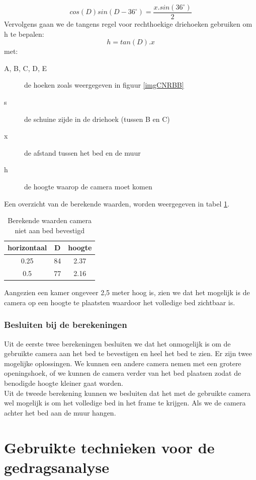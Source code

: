 \begin{displaymath}
cos(D)sin(D-36 ^\circ)=\frac{x . sin(36^\circ)}{2}
\end{displaymath}
Vervolgens gaan we de tangens regel voor rechthoekige driehoeken gebruiken om h te bepalen:
\begin{displaymath}
h=tan(D) . x
\end{displaymath}
met:
\begin{description}
	\item [A, B, C, D, E] de hoeken zoals weergegeven in figuur \ref{imgCNRBB}
	\item[s] de schuine zijde in de driehoek (tussen B en C)
	\item[x] de afstand tussen het bed en de muur
	\item[h] de hoogte waarop de camera moet komen
\end{description}
Een overzicht van de berekende waarden, worden weergegeven in tabel \ref{refTabCNB}.

\begin{table}[hbp]
	\caption{Berekende waarden camera niet aan bed bevestigd}
	\begin{tabular}{|c|c|c|}
		\hline
		horizontaal & D & hoogte \\ \hline
		0.25 & 84 & 2.37 \\ \hline
		0.5 & 77 & 2.16 \\ 
		\hline
	\end{tabular}
	\label{refTabCNB}
\end{table}
Aangezien een kamer ongeveer 2,5 meter hoog is, zien we dat het mogelijk is de camera op een hoogte te plaatsten waardoor het volledige bed zichtbaar is.

\subsubsection{Besluiten bij de berekeningen}
Uit de eerste twee berekeningen besluiten we dat het onmogelijk is om de gebruikte camera aan het bed te bevestigen en heel het bed te zien. Er zijn twee mogelijke oplossingen. We kunnen een andere camera nemen met een grotere openingshoek, of we kunnen de camera verder van het bed plaatsen zodat de benodigde hoogte kleiner gaat worden.\\
Uit de tweede berekening kunnen we besluiten dat het met de gebruikte camera wel mogelijk is om het volledige bed in het frame te krijgen. Als we de camera achter het bed aan de muur hangen.

\section{Gebruikte technieken voor de gedragsanalyse}
\label{MRefMGA}

